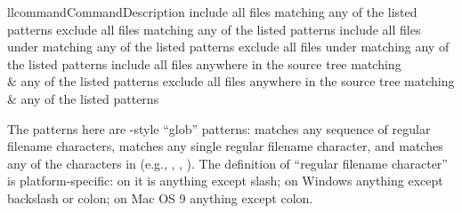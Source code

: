 \documentclass{manual}
\begin{document}
\begin{tableii}{ll}{command}{Command}{Description}
    {include all files matching any of the listed patterns}
    {exclude all files matching any of the listed patterns}
    {include all files under  matching any of the listed patterns}
    {exclude all files under  matching any of the listed patterns}
    {include all files anywhere in the source tree matching\\&
     any of the listed patterns}
    {exclude all files anywhere in the source tree matching\\&
     any of the listed patterns}
\end{tableii}

The patterns here are \UNIX-style ``glob'' patterns: \code{*} matches any
sequence of regular filename characters,  matches any single
regular filename character, and  matches any of the
characters in  (e.g., , ,
).  The definition of ``regular filename character'' is
platform-specific: on \UNIX{} it is anything except slash; on Windows
anything except backslash or colon; on Mac OS 9 anything except colon.







\end{document}
